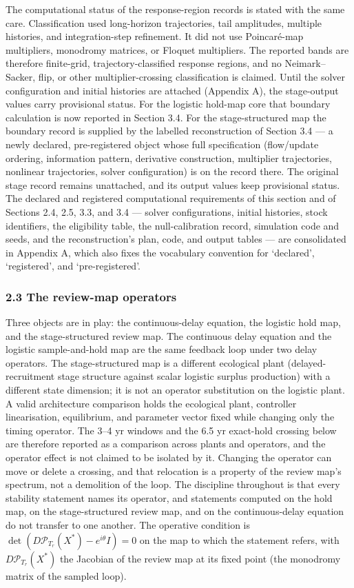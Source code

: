 \documentclass[11pt]{article}
\begin{document}
The computational status of the response-region records is stated with
the same care. Classification used long-horizon trajectories, tail
amplitudes, multiple histories, and integration-step refinement. It did
not use Poincar\'e-map multipliers, monodromy matrices, or Floquet
multipliers. The reported bands are therefore finite-grid,
trajectory-classified response regions, and no Neimark--Sacker, flip, or
other multiplier-crossing classification is claimed. Until the solver
configuration and initial histories are attached (Appendix A), the
stage-output values carry provisional status. For the logistic hold-map
core that boundary calculation is now reported in Section 3.4. For the
stage-structured map the boundary record is supplied by the labelled
reconstruction of Section 3.4 --- a newly declared, pre-registered
object whose full specification (flow/update ordering, information
pattern, derivative construction, multiplier trajectories, nonlinear
trajectories, solver configuration) is on the record there. The original
stage record remains unattached, and its output values keep provisional
status. The declared and registered computational requirements of this
section and of Sections 2.4, 2.5, 3.3, and 3.4 --- solver
configurations, initial histories, stock identifiers, the eligibility
table, the null-calibration record, simulation code and seeds, and the
reconstruction's plan, code, and output tables --- are consolidated in
Appendix A, which also fixes the vocabulary convention for `declared',
`registered', and `pre-registered'.

\subsubsection{2.3 The review-map
operators}\label{the-review-map-operators}

Three objects are in play: the continuous-delay equation, the logistic
hold map, and the stage-structured review map. The continuous delay
equation and the logistic sample-and-hold map are the same feedback loop
under two delay operators. The stage-structured map is a different
ecological plant (delayed-recruitment stage structure against scalar
logistic surplus production) with a different state dimension; it is not
an operator substitution on the logistic plant. A valid architecture
comparison holds the ecological plant, controller linearisation,
equilibrium, and parameter vector fixed while changing only the timing
operator. The 3--4 yr windows and the 6.5 yr exact-hold crossing below
are therefore reported as a comparison across plants and operators, and
the operator effect is not claimed to be isolated by it. Changing the
operator can move or delete a crossing, and that relocation is a
property of the review map's spectrum, not a demolition of the loop. The
discipline throughout is that every stability statement names its
operator, and statements computed on the hold map, on the
stage-structured review map, and on the continuous-delay equation do not
transfer to one another. The operative condition is
\(\det(D\mathcal P_{T_r}(X^*)-e^{i\theta}I)=0\) on the map to which the
statement refers, with \(D\mathcal P_{T_r}(X^*)\) the Jacobian of the
review map at its fixed point (the monodromy matrix of the sampled
loop).
\end{document}
